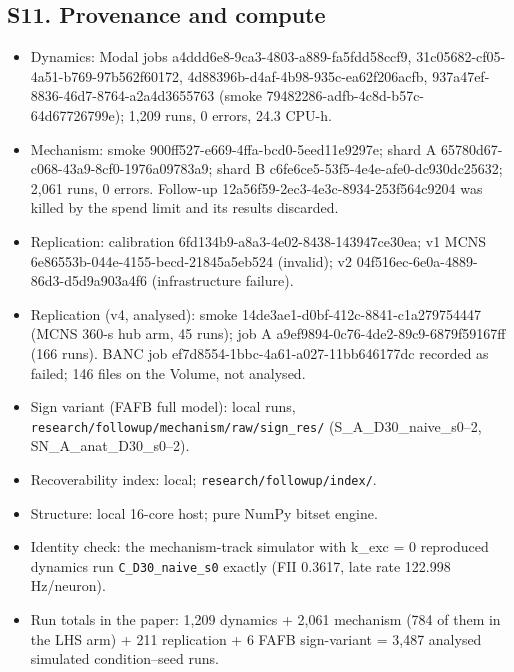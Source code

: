 \documentclass[11pt]{article}
\providecommand{\tightlist}{\setlength{\itemsep}{0pt}\setlength{\parskip}{0pt}}
\begin{document}
\subsection{S11. Provenance and compute}\label{s11.-provenance-and-compute}

\begin{itemize}
\tightlist
\item
  Dynamics: Modal jobs a4ddd6e8-9ca3-4803-a889-fa5fdd58ccf9, 31c05682-cf05-4a51-b769-97b562f60172, 4d88396b-d4af-4b98-935c-ea62f206acfb, 937a47ef-8836-46d7-8764-a2a4d3655763 (smoke 79482286-adfb-4c8d-b57c-64d67726799e); 1,209 runs, 0 errors, 24.3 CPU-h.
\item
  Mechanism: smoke 900ff527-e669-4ffa-bcd0-5eed11e9297e; shard A 65780d67-c068-43a9-8cf0-1976a09783a9; shard B c6fe6ce5-53f5-4e4e-afe0-dc930dc25632; 2,061 runs, 0 errors. Follow-up 12a56f59-2ec3-4e3c-8934-253f564c9204 was killed by the spend limit and its results discarded.
\item
  Replication: calibration 6fd134b9-a8a3-4e02-8438-143947ce30ea; v1 MCNS 6e86553b-044e-4155-becd-21845a5eb524 (invalid); v2 04f516ec-6e0a-4889-86d3-d5d9a903a4f6 (infrastructure failure).
\item
  Replication (v4, analysed): smoke 14de3ae1-d0bf-412c-8841-c1a279754447 (MCNS 360-s hub arm, 45 runs); job A a9ef9894-0c76-4de2-89c9-6879f59167ff (166 runs). BANC job ef7d8554-1bbc-4a61-a027-11bb646177dc recorded as failed; 146 files on the Volume, not analysed.
\item
  Sign variant (FAFB full model): local runs, \texttt{research/followup/mechanism/raw/sign\_res/} (S\_A\_D30\_naive\_s0--2, SN\_A\_anat\_D30\_s0--2).
\item
  Recoverability index: local; \texttt{research/followup/index/}.
\item
  Structure: local 16-core host; pure NumPy bitset engine.
\item
  Identity check: the mechanism-track simulator with k\_exc = 0 reproduced dynamics run \texttt{C\_D30\_naive\_s0} exactly (FII 0.3617, late rate 122.998 Hz/neuron).
\item
  Run totals in the paper: 1,209 dynamics + 2,061 mechanism (784 of them in the LHS arm) + 211 replication + 6 FAFB sign-variant = 3,487 analysed simulated condition--seed runs.
\end{itemize}
\end{document}
